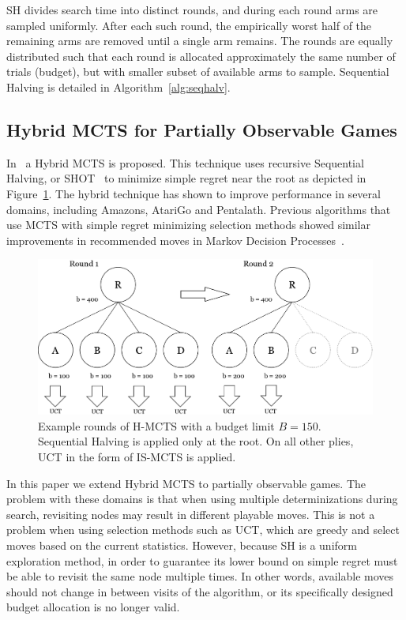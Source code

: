\documentclass[a4paper]{llncs}
\begin{document}
SH divides search time into distinct rounds, and during each round arms are sampled uniformly. After each such round, the empirically worst half of the remaining arms are removed until a single arm remains. The rounds are equally distributed such that each round is allocated approximately the same number of trials (budget), but with smaller subset of available arms to sample. Sequential Halving is detailed in Algorithm~\ref{alg:seqhalv}.

\subsection{Hybrid MCTS for Partially Observable Games}
\label{subsec:h-mcts_po}

In~\cite{Pepels14hmcts} a Hybrid MCTS is proposed. This technique uses recursive Sequential Halving, or SHOT~\cite{Cazenave14SHOT} to minimize simple regret near the root as depicted in Figure~\ref{fig:h-mcts_rounds}. The hybrid technique has shown to improve performance in several domains, including Amazons, AtariGo and Pentalath.  Previous algorithms that use MCTS with simple regret minimizing selection methods showed similar improvements in recommended moves in Markov Decision Processes~\cite{Feldman12BRUE,tolpin2012mcts}.

\begin{figure}[ht]
	\centering
	\includegraphics[width=.75\textwidth]{img/H-MCTS_Rounds.png}
	\caption[Hybrid MCTS example rounds]{Example rounds of H-MCTS with a budget limit $B = 150$. Sequential Halving is applied only at the root. On all other plies, UCT in the form of IS-MCTS is applied.}
	\label{fig:h-mcts_rounds}
\end{figure}

In this paper we extend Hybrid MCTS to partially observable games. The problem with these domains is that when using multiple determinizations during search, revisiting nodes may result in different playable moves. This is not a problem when using selection methods such as UCT, which are greedy and select moves based on the current statistics. However, because SH is a uniform exploration method, in order to guarantee its lower bound on simple regret must be able to revisit the same node multiple times. In other words, available moves should not change in between visits of the algorithm, or its specifically designed budget allocation is no longer valid.
\end{document}
